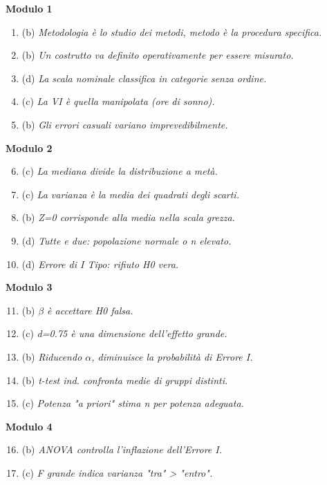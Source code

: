 \documentclass[12pt, a4paper]{article}
\begin{document}
\begin{footnotesize}
\begin{multicols}{2}
\textbf{Modulo 1}
\begin{enumerate}
    \item (b) \textit{Metodologia è lo studio dei metodi, metodo è la procedura specifica.}
    \item (b) \textit{Un costrutto va definito operativamente per essere misurato.}
    \item (d) \textit{La scala nominale classifica in categorie senza ordine.}
    \item (c) \textit{La VI è quella manipolata (ore di sonno).}
    \item (b) \textit{Gli errori casuali variano imprevedibilmente.}
\end{enumerate}
\vspace{0.5cm}
\textbf{Modulo 2}
\begin{enumerate}
    \setcounter{enumi}{5}
    \item (c) \textit{La mediana divide la distribuzione a metà.}
    \item (c) \textit{La varianza è la media dei quadrati degli scarti.}
    \item (b) \textit{Z=0 corrisponde alla media nella scala grezza.}
    \item (d) \textit{Tutte e due: popolazione normale o n elevato.}
    \item (d) \textit{Errore di I Tipo: rifiuto H0 vera.}
\end{enumerate}
\vspace{0.5cm}
\textbf{Modulo 3}
\begin{enumerate}
    \setcounter{enumi}{10}
    \item (b) \textit{$\beta$ è accettare H0 falsa.}
    \item (c) \textit{d=0.75 è una dimensione dell'effetto grande.}
    \item (b) \textit{Riducendo $\alpha$, diminuisce la probabilità di Errore I.}
    \item (b) \textit{t-test ind. confronta medie di gruppi distinti.}
    \item (c) \textit{Potenza "a priori" stima n per potenza adeguata.}
\end{enumerate}
\columnbreak
\textbf{Modulo 4}
\begin{enumerate}
    \setcounter{enumi}{15}
    \item (b) \textit{ANOVA controlla l'inflazione dell'Errore I.}
    \item (c) \textit{F grande indica varianza "tra" > "entro".}

\end{enumerate}
\end{multicols}
\end{footnotesize}
\end{document}
